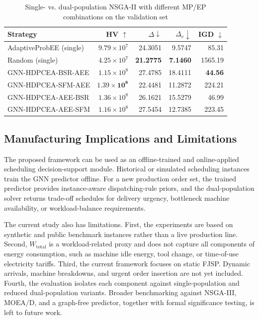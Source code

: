 \documentclass[pdflatex,iicol,Numbered,sn-basic]{sn-jnl}
\begin{document}
\begin{table}[t]
  \caption{Single- vs. dual-population NSGA-II with different MP/EP combinations on the validation set}
  \label{tab:dual_pop}
  \centering
  \begin{tabular}{lrrrr}
    \toprule
    Strategy                & HV $\uparrow$               & $\Delta \downarrow$ & $\Delta_v \downarrow$ & IGD $\downarrow$ \\
    \midrule
    AdaptiveProbEE (single) & $9.79{\times}10^7$          & 24.3051             & 9.5747                & 85.31            \\
    Random (single)         & $4.25{\times}10^7$          & \textbf{21.2775}    & \textbf{7.1460}       & 1565.19          \\
    GNN-HDPCEA-BSR-AEE      & $1.15{\times}10^8$          & 27.4785             & 18.4111               & \textbf{44.56}   \\
    GNN-HDPCEA-SFM-AEE      & $\mathbf{1.39{\times}10^8}$ & 22.4481             & 11.2872               & 224.21           \\
    GNN-HDPCEA-AEE-BSR      & $1.36{\times}10^8$          & 26.1621             & 15.5279               & 46.99            \\
    GNN-HDPCEA-AEE-SFM      & $1.16{\times}10^8$          & 27.5454             & 12.7385               & 223.45           \\
    \bottomrule
  \end{tabular}
\end{table}





\subsection{Manufacturing Implications and Limitations}\label{subsec:discussion}
The proposed framework can be used as an offline-trained and online-applied scheduling decision-support module. Historical or simulated scheduling instances train the GNN predictor offline. For a new production order set, the trained predictor provides instance-aware dispatching-rule priors, and the dual-population solver returns trade-off schedules for delivery urgency, bottleneck machine availability, or workload-balance requirements.

The current study also has limitations.
First, the experiments are based on synthetic and public benchmark instances rather than a live production line.
Second, $W_{\mathrm{total}}$ is a workload-related proxy and does not capture all components of energy consumption, such as machine idle energy, tool change, or time-of-use electricity tariffs.
Third, the current framework focuses on static FJSP. Dynamic arrivals, machine breakdowns, and urgent order insertion are not yet included.
Fourth, the evaluation isolates each component against single-population and reduced dual-population variants. Broader benchmarking against NSGA-III, MOEA/D, and a graph-free predictor, together with formal significance testing, is left to future work.
\end{document}
